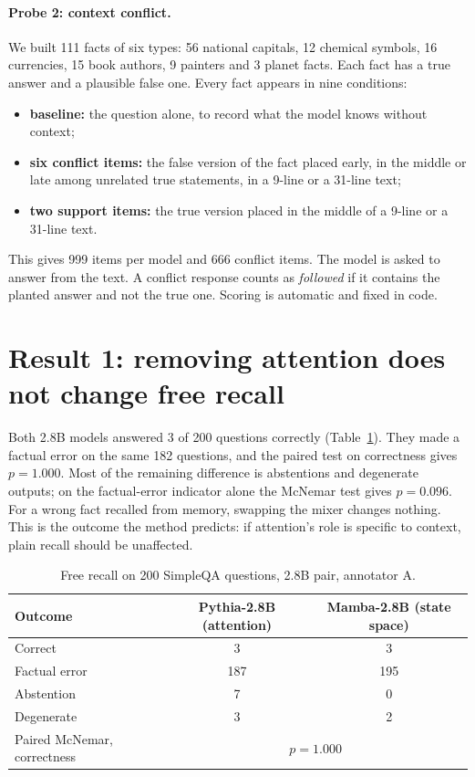 \documentclass[11pt,a4paper,oneside]{report}
\begin{document}
\paragraph{Probe 2: context conflict.} We built 111 facts of six types: 56 national capitals, 12 chemical symbols, 16 currencies, 15 book authors, 9 painters and 3 planet facts. Each fact has a true answer and a plausible false one. Every fact appears in nine conditions:
\begin{itemize}
\item \textbf{baseline:} the question alone, to record what the model knows without context;
\item \textbf{six conflict items:} the false version of the fact placed early, in the middle or late among unrelated true statements, in a 9-line or a 31-line text;
\item \textbf{two support items:} the true version placed in the middle of a 9-line or a 31-line text.
\end{itemize}
This gives 999 items per model and 666 conflict items. The model is asked to answer from the text. A conflict response counts as \emph{followed} if it contains the planted answer and not the true one. Scoring is automatic and fixed in code.

\section{Result 1: removing attention does not change free recall}
Both 2.8B models answered 3 of 200 questions correctly (Table~\ref{tab:recall}). They made a factual error on the same 182 questions, and the paired test on correctness gives $p=1.000$. Most of the remaining difference is abstentions and degenerate outputs; on the factual-error indicator alone the McNemar test gives $p=0.096$. For a wrong fact recalled from memory, swapping the mixer changes nothing. This is the outcome the method predicts: if attention's role is specific to context, plain recall should be unaffected.

\begin{table}[h]
\centering\small
\caption{Free recall on 200 SimpleQA questions, 2.8B pair, annotator A.}
\label{tab:recall}
\begin{tabular}{@{}lcc@{}}
\toprule
Outcome & Pythia-2.8B (attention) & Mamba-2.8B (state space)\\
\midrule
Correct & 3 & 3\\
Factual error & 187 & 195\\
Abstention & 7 & 0\\
Degenerate & 3 & 2\\
\midrule
Paired McNemar, correctness & \multicolumn{2}{c}{$p=1.000$}\\
\bottomrule
\end{tabular}
\end{table}
\end{document}
